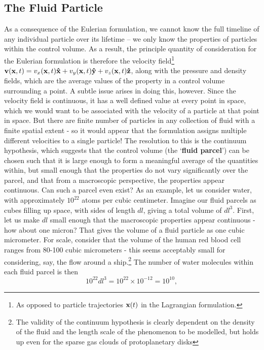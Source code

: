 \subsection{The Fluid Particle}
As a consequence of the Eulerian formulation, we cannot know the full timeline of any individual particle over its lifetime -- we only know the properties of particles within the control volume. As a result, the principle quantity of consideration for the Eulerian formulation is therefore the {velocity field}\footnote{As opposed to particle trajectories $\mathbf{x}(t)$ in the Lagrangian formulation.} $\mathbf{v}(\mathbf{x},t) = v_x(\mathbf{x},t) \mathbf{\hat{x}} + v_y (\mathbf{x},t)\mathbf{\hat{y}} + v_z(\mathbf{x},t) \mathbf{\hat{z}}$, along with the pressure and density fields, which are the average values of the property in a control volume surrounding a point. A subtle issue arises in doing this, however. Since the velocity field is continuous, it has a well defined value at every point in space, which we would want to be associated with the velocity of a particle at that point in space. But there are finite number of particles in any collection of fluid with a finite spatial extent - so it would appear that the formulation assigns multiple different velocities to a single particle! The resolution to this is the continuum hypothesis, which suggests that the control volume (the `{\bf fluid parcel}') can be chosen such that it is large enough to form a meaningful average of the quantities within, but small enough that the properties do not vary significantly over the parcel, and that from a macroscopic perspective, the properties appear continuous. 
Can such a  parcel even exist? As an example, let us consider water, with approximately $10^{22}$ atoms per cubic centimeter. Imagine our fluid parcels as cubes filling up space, with sides of length $dl$, giving a total volume of $dl^3$. First, let us make $dl$ small enough that the macroscopic properties appear continuous - how about one micron? That gives the volume of a fluid particle as one cubic micrometer. For scale, consider that the volume of the human red blood cell ranges from 80-100 cubic micrometers\cite{Fischer1983} - this seems acceptably small for considering, say, the flow around a ship.\footnote{The validity of the continuum hypothesis is clearly dependent on the density of the fluid and the length scale of the phenomenon to be modelled, but holds up even for the sparse gas clouds of protoplanetary disks} The number of water molecules within each fluid parcel is then 
\begin{equation}
10^{22}dl^3 = 10^{22} \times 10^{-12} = 10^{10},
\end{equation}   

